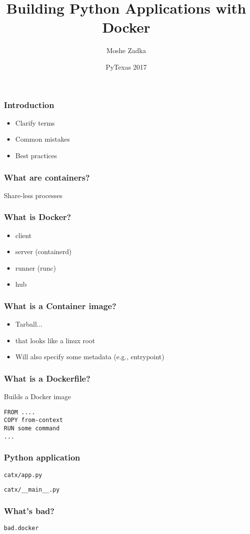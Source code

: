 \documentclass{beamer}
\title{Building Python Applications with Docker}
\author{Moshe Zadka}
\date{PyTexas 2017}
\begin{document}
 
\frame{\titlepage}

\begin{frame}
\frametitle{Introduction}
\begin{itemize}
\item Clarify terms \pause
\item Common mistakes \pause
\item Best practices
\end{itemize}
\end{frame}

\begin{frame}[fragile]
\frametitle{What are containers?}
Share-less processes
\end{frame}

\begin{frame}[fragile]
\frametitle{What is Docker?}
\begin{itemize}
\item client \pause
\item server (containerd) \pause
\item runner (runc) \pause
\item hub
\end{itemize}
\end{frame}

\begin{frame}[fragile]
\frametitle{What is a Container image?}
\begin{itemize}
\item Tarball... \pause
\item that looks like a linux root \pause
\item Will also specify some metadata (e.g., entrypoint)
\end{itemize}
\end{frame}

\begin{frame}[fragile]
\frametitle{What is a Dockerfile?}
Builds a Docker image
\begin{lstlisting}
FROM ....
COPY from-context
RUN some command
...
\end{lstlisting}
\end{frame}

\begin{frame}[fragile]
\frametitle{Python application}
\verb|catx/app.py|

\verb|catx/__main__.py|

\end{frame}

\begin{frame}[fragile]
\frametitle{What's bad?}
\verb|bad.docker|

\end{frame}
\end{document}

